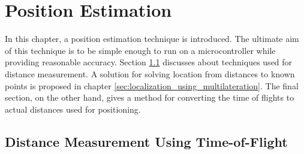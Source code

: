 \documentclass[\main/thesis.tex]{subfiles}
\begin{document}
\graphicspath{{img/}{position_estimation/img/}}
\chapter{Position Estimation}

In this chapter, a position estimation technique is introduced. The ultimate aim of this technique is to be simple enough to run on a microcontroller while providing reasonable accuracy. Section \ref{sec:distance_measurement_using_time_of_flight} discusses about techniques used for distance measurement. A solution for solving location from distances to known points is proposed in chapter \ref{sec:localization_using_multilateration}. The final section, on the other hand, gives a method for converting the time of flights to actual distances used for positioning.

\section{Distance Measurement Using Time-of-Flight}
\label{sec:distance_measurement_using_time_of_flight}
\end{document}

